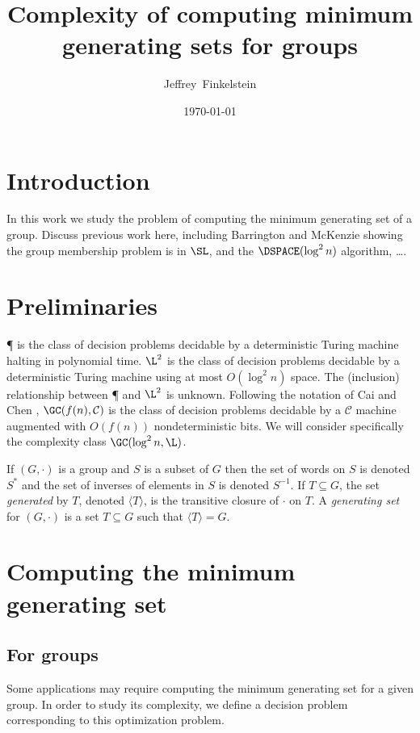 \documentclass{article}
\title{Complexity of computing minimum generating sets for groups}
\author{Jef{}frey~Finkelstein}
\date{\today}
\newcommand{\gen}[1]{{\langle #1 \rangle}}
\begin{document}
\maketitle

\section{Introduction}

In this work we study the problem of computing the minimum generating set of a group.
Discuss previous work here, including Barrington and McKenzie showing the group membership problem is in $\SL$, and the $\DSPACE(\log^2 n)$ algorithm, \ldots.

\section{Preliminaries}

\P{} is the class of decision problems decidable by a deterministic Turing machine halting in polynomial time.
$\L^2$ is the class of decision problems decidable by a deterministic Turing machine using at most $O(\log^2 n)$ space.
The (inclusion) relationship between \P{} and $\L^2$ is unknown.
Following the notation of Cai and Chen \cite{cc97}, $\GC(f(n), \mathcal{C})$ is the class of decision problems decidable by a $\mathcal{C}$ machine augmented with $O(f(n))$ nondeterministic bits.
We will consider specifically the complexity class $\GC(\log^2 n, \L)$.

If $(G, \cdot)$ is a group and $S$ is a subset of $G$ then the set of words on $S$ is denoted $S^*$ and the set of inverses of elements in $S$ is denoted $S^{-1}$.
If $T \subseteq G$, the set \emph{generated} by $T$, denoted $\gen{T}$, is the transitive closure of $\cdot$ on $T$.
A \emph{generating set} for $(G, \cdot)$ is a set $T \subseteq G$ such that $\gen{T} = G$.

\section{Computing the minimum generating set}

\subsection{For groups}

Some applications may require computing the minimum generating set for a given group.
In order to study its complexity, we define a decision problem corresponding to this optimization problem.
\end{document}

